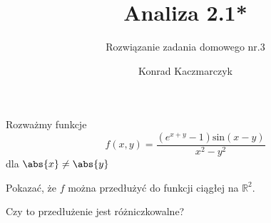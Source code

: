 \documentclass[11pt]{scrartcl}
\author{Konrad Kaczmarczyk}
\begin{document}
  \title{Analiza 2.1*}
  \subtitle{Rozwiązanie zadania domowego nr.3}
  \maketitle
    \begin{zadanie*}
        Rozważmy funkcje 
        \[
          f(x,y) = \frac{\left ( e^{x+y} - 1 \right ) \text{sin} \left ( x - y \right ) }{x^2 - y^2}
        \]
        dla $\abs{x} \not = \abs{y}  $
        \begin{walk}
            \item Pokazać, że $f$ można przedłużyć do funkcji ciągłej na $\mathbb{R}^2$.
            \item Czy to przedłużenie jest różniczkowalne?
        \end{walk}
        
    \end{zadanie*}
    
\end{document}
